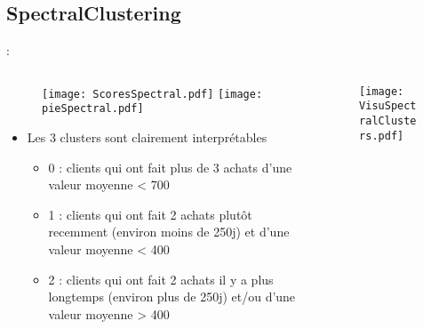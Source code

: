 \documentclass[8pt,aspectratio=169,hyperref={unicode=true}]{beamer}
\begin{document}
\subsection{SpectralClustering}
\begin{frame}{\insertsection: \insertsubsection}
    \begin{columns}
        \begin{column}{.55\textwidth}
            \begin{figure}
                \texttt{[image: ScoresSpectral.pdf]}
                \texttt{[image: pieSpectral.pdf]}
            \end{figure}
            \begin{itemize}
                \item Les 3 clusters sont clairement interprétables
                      \begin{itemize}
                          \item 0 : clients qui ont fait plus de 3 achats d'une valeur moyenne < 700
                          \item 1 : clients qui ont fait 2 achats plutôt recemment (environ moins de 250j) et d'une valeur moyenne < 400
                          \item 2 : clients qui ont fait 2 achats il y a plus longtemps (environ plus de 250j) et/ou d'une valeur moyenne > 400
                      \end{itemize}
            \end{itemize}
        \end{column}
        \begin{column}{.45\textwidth}
            \begin{figure}
                \texttt{[image: VisuSpectralClusters.pdf]}
            \end{figure}
        \end{column}
    \end{columns}
\end{frame}
\end{document}
